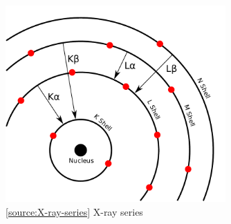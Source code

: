 \documentclass[oneside]{book}
\begin{document}
\begin{figure}[H]
    \centering
    \includegraphics[width=0.75\textwidth]{../images/CharacteristicRadiation.pdf}
        \caption{\ref{source:X-ray-series} X-ray series}
        \label{fig:X-ray-series}
\end{figure}
\end{document}
